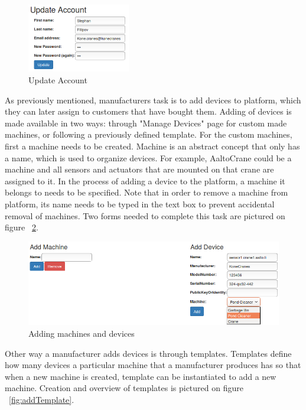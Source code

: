 \begin{figure}[ht]
	\begin{center}
		\includegraphics[width=0.4\textwidth]{images/implementation/UpdateAccount}
		\caption{Update Account}
		\label{fig:UpdateAccount}
	\end{center}
\end{figure}

As previously mentioned, manufacturers task is to add devices to platform, which they can later assign to customers that have bought them. Adding of devices is made available in two ways: through "Manage Devices" page for custom made machines, or following a previously defined template. For the custom machines, first a machine needs to be created. Machine is an abstract concept that only has a name, which is used to organize devices. For example, AaltoCrane could be a machine and all sensors and actuators that are mounted on that crane are assigned to it. In the process of adding a device to the platform, a machine it belongs to needs to be specified. Note that in order to remove a machine from platform, its name needs to be typed in the text box to prevent accidental removal of machines. Two forms needed to complete this task are pictured on figure ~\ref{fig:AddMachineDevice}. 

\begin{figure}[ht]
	\begin{center}
		\includegraphics[width=\textwidth]{images/implementation/AddMachineDevice}
		\caption{Adding machines and devices}
		\label{fig:AddMachineDevice}
	\end{center}
\end{figure}

Other way a manufacturer adds devices is through templates. Templates define how many devices a particular machine that a manufacturer produces has so that when a new machine is created, template can be instantiated to add a new machine. Creation and overview of templates is pictured on figure ~\ref{fig:addTemplate}. 

